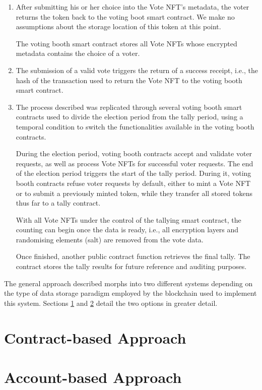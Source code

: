 \documentclass[../main.tex]{subfiles}
\begin{document}
\begin{enumerate}
    \item{After submitting his or her choice into the Vote NFT's metadata, the voter returns the token back to the voting boot smart contract. We make no assumptions about the storage location of this token at this point.
          \par
          The voting booth smart contract stores all Vote NFTs whose encrypted metadata contains the choice of a voter.}

    \item{The submission of a valid vote triggers the return of a success receipt, i.e., the hash of the transaction used to return the Vote NFT to the voting booth smart contract.}

    \item{The process described was replicated through several voting booth smart contracts used to divide the election period from the tally period, using a temporal condition to switch the functionalities available in the voting booth contracts.
          \par
          During the election period, voting booth contracts accept and validate voter requests, as well as process Vote NFTs for successful voter requests. The end of the election period triggers the start of the tally period. During it, voting booth contracts refuse voter requests by default, either to mint a Vote NFT or to submit a previously minted token, while they transfer all stored tokens thus far to a tally contract.
          \par
          With all Vote NFTs under the control of the tallying smart contract, the counting can begin once the data is ready, i.e., all encryption layers and randomising elements (salt) are removed from the vote data.
          \par
          Once finished, another public contract function retrieves the final tally. The contract stores the tally results for future reference and auditing purposes.}
\end{enumerate}

The general approach described morphs into two different systems depending on the type of data storage paradigm employed by the blockchain used to implement this system. Sections \ref{contract-based-approach} and \ref{account-based-approach} detail the two options in greater detail.

\section{Contract-based Approach}
\label{contract-based-approach}


\section{Account-based Approach}
\label{account-based-approach}

\end{document}
